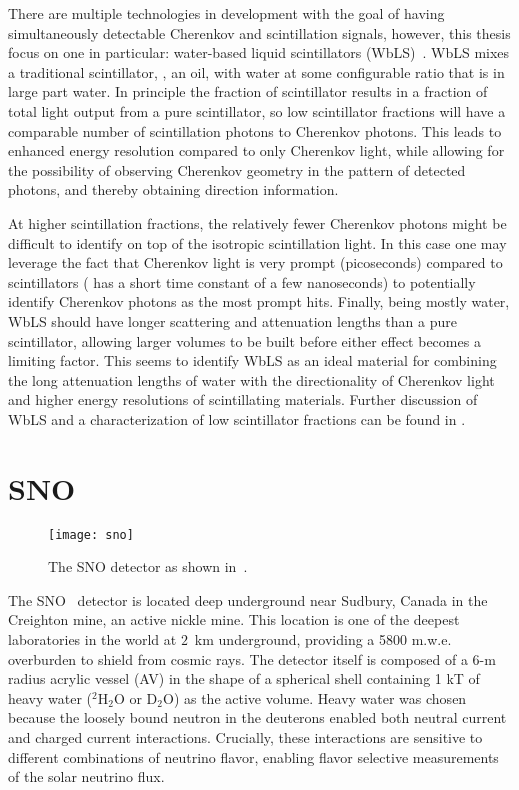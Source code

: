 There are multiple technologies in development with the goal of having simultaneously detectable Cherenkov and scintillation signals, however, this thesis focus on one in particular: water-based liquid scintillators (WbLS)~\cite{wbls}.
WbLS mixes a traditional scintillator, {\labppo}, an oil, with water at some configurable ratio that is in large part water.
In principle the fraction of scintillator results in a fraction of total light output from a pure scintillator, so low scintillator fractions will have a comparable number of scintillation photons to Cherenkov photons. 
This leads to enhanced energy resolution compared to only Cherenkov light, while allowing for the possibility of observing Cherenkov geometry in the pattern of detected photons, and thereby obtaining direction information.

At higher scintillation fractions, the relatively fewer Cherenkov photons might be difficult to identify on top of the isotropic scintillation light.
In this case one may leverage the fact that Cherenkov light is very prompt (picoseconds) compared to scintillators ({\labppo} has a short time constant of a few nanoseconds) to potentially identify Cherenkov photons as the most prompt hits.
Finally, being mostly water, WbLS should have longer scattering and attenuation lengths than a pure scintillator, allowing larger volumes to be built before either effect becomes a limiting factor.
This seems to identify WbLS as an ideal material for combining the long attenuation lengths of water with the directionality of Cherenkov light and higher energy resolutions of scintillating materials.
Further discussion of WbLS and a characterization of low scintillator fractions can be found in .

\section{SNO}

\begin{figure}
\centering
\texttt{[image: sno]}
\caption{\label{fig:sno}The SNO detector as shown in~\cite{sno}.}
\end{figure}

The SNO~\cite{sno} detector is located deep underground near Sudbury, Canada in the Creighton mine, an active nickle mine.
This location is one of the deepest laboratories in the world at $2$~km underground, providing a 5800 m.w.e. overburden to shield from cosmic rays.
The detector itself is composed of a 6-m radius acrylic vessel (AV) in the shape of a spherical shell containing 1 kT of heavy water ($^2$H$_2$O or D$_2$O) as the active volume.
Heavy water was chosen because the loosely bound neutron in the deuterons enabled both neutral current and charged current interactions.
Crucially, these interactions are sensitive to different combinations of neutrino flavor, enabling flavor selective measurements of the solar neutrino flux.

